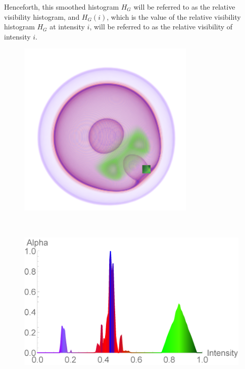 \documentclass[twoside,twocolumn,10pt]{article}
\begin{document}
Henceforth, this smoothed histogram $ H_{G} $ will be referred to as the relative visibility histogram, and $ H_{G}(i) $, which is the value of the relative visibility histogram $ H_{G} $ at intensity $ i $, will be referred to as the relative visibility of intensity $ i$.




\begin{figure}
	\centering
	\begin{minipage}{.1\textwidth}
		\centering
		\includegraphics[width=1\linewidth]{nucleon_blue_crop}
		\label{fig:nucleon_2_blue}
	\end{minipage}~
	\begin{minipage}{.13\textwidth}
		\centering
		\includegraphics[width=1\linewidth]{tf_nucleon_2_blue}

\end{minipage}
\end{figure}
\end{document}
